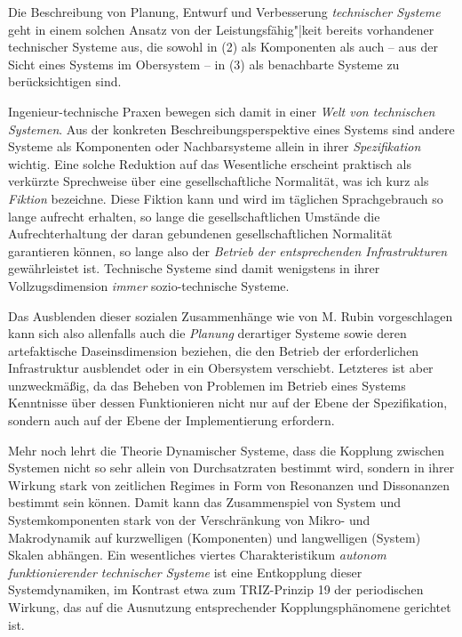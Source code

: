 \documentclass[11pt,a4paper]{article}
\begin{document}
Die Beschreibung von Planung, Entwurf und Verbesserung \emph{technischer
  Systeme} geht in einem solchen Ansatz von der Leistungsfähig"|keit bereits
vorhandener technischer Systeme aus, die sowohl in (2) als Komponenten als
auch -- aus der Sicht eines Systems im Obersystem -- in (3) als benachbarte
Systeme zu berücksichtigen sind.

Ingenieur-technische Praxen bewegen sich damit in einer \emph{Welt von
  technischen Systemen}. Aus der konkreten Beschreibungsperspektive eines
Systems sind andere Systeme als Komponenten oder Nachbarsysteme allein in
ihrer \emph{Spezifikation} wichtig. Eine solche Reduktion auf das Wesentliche
erscheint praktisch als verkürzte Sprechweise über eine gesellschaftliche
Normalität, was ich kurz als \emph{Fiktion} bezeichne.  Diese Fiktion kann und
wird im täglichen Sprachgebrauch so lange aufrecht erhalten, so lange die
gesellschaftlichen Umstände die Aufrechterhaltung der daran gebundenen
gesellschaftlichen Normalität garantieren können, so lange also der
\emph{Betrieb der entsprechenden Infrastrukturen} gewährleistet ist.
Technische Systeme sind damit wenigstens in ihrer Vollzugsdimension
\emph{immer} sozio-technische Systeme.

Das Ausblenden dieser sozialen Zusammenhänge wie von M. Rubin vorgeschlagen
kann sich also allenfalls auch die \emph{Planung} derartiger Systeme sowie
deren artefaktische Daseinsdimension beziehen, die den Betrieb der
erforderlichen Infrastruktur ausblendet oder in ein Obersystem verschiebt.
Letzteres ist aber unzweckmäßig, da das Beheben von Problemen im Betrieb eines
Systems Kenntnisse über dessen Funktionieren nicht nur auf der Ebene der
Spezifikation, sondern auch auf der Ebene der Implementierung erfordern.

Mehr noch lehrt die Theorie Dynamischer Systeme, dass die Kopplung zwischen
Systemen nicht so sehr allein von Durchsatzraten bestimmt wird, sondern in
ihrer Wirkung stark von zeitlichen Regimes in Form von Resonanzen und
Dissonanzen bestimmt sein können.  Damit kann das Zusammenspiel von System und
Systemkomponenten stark von der Verschränkung von Mikro- und Makrodynamik auf
kurzwelligen (Komponenten) und langwelligen (System) Skalen abhängen.  Ein
wesentliches viertes Charakteristikum \emph{autonom funktionierender
  technischer Systeme} ist eine Entkopplung dieser Systemdynamiken, im
Kontrast etwa zum TRIZ-Prinzip 19 der periodischen Wirkung, das auf die
Ausnutzung entsprechender Kopplungsphänomene gerichtet ist.
\end{document}
